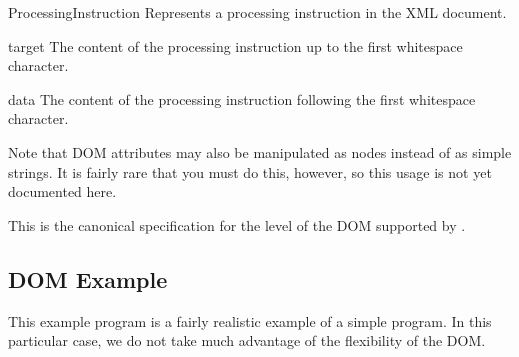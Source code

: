 \begin{classdesc}{ProcessingInstruction}{}
Represents a processing instruction in the XML document.

\begin{memberdesc}{target}
The content of the processing instruction up to the first whitespace
character.
\end{memberdesc}

\begin{memberdesc}{data}
The content of the processing instruction following the first
whitespace character.
\end{memberdesc}
\end{classdesc}

Note that DOM attributes may also be manipulated as nodes instead of as
simple strings. It is fairly rare that you must do this, however, so this
usage is not yet documented here.


\begin{seealso}
           {This is the canonical specification for the level of the
            DOM supported by .}
\end{seealso}


\subsection{DOM Example \label{dom-example}}

This example program is a fairly realistic example of a simple
program. In this particular case, we do not take much advantage
of the flexibility of the DOM.

